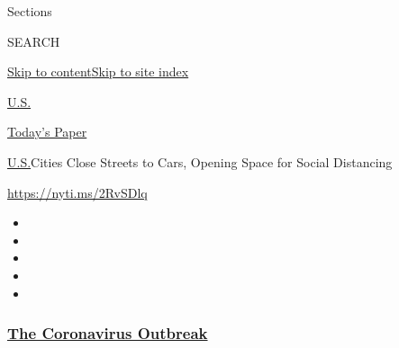Sections

SEARCH

\protect\hyperlink{site-content}{Skip to
content}\protect\hyperlink{site-index}{Skip to site index}

\href{https://www.nytimes3xbfgragh.onion/section/us}{U.S.}

\href{https://myaccount.nytimes3xbfgragh.onion/auth/login?response_type=cookie\&client_id=vi}{}

\href{https://www.nytimes3xbfgragh.onion/section/todayspaper}{Today's
Paper}

\href{/section/us}{U.S.}\textbar{}Cities Close Streets to Cars, Opening
Space for Social Distancing

\url{https://nyti.ms/2RvSDlq}

\begin{itemize}
\item
\item
\item
\item
\item
\end{itemize}

\hypertarget{the-coronavirus-outbreak}{%
\subsubsection{\texorpdfstring{\href{https://www.nytimes3xbfgragh.onion/news-event/coronavirus?name=styln-coronavirus-national\&region=TOP_BANNER\&block=storyline_menu_recirc\&action=click\&pgtype=Article\&impression_id=7f70ef90-f1d4-11ea-ad2b-99be98891f0b\&variant=undefined}{The
Coronavirus
Outbreak}}{The Coronavirus Outbreak}}\label{the-coronavirus-outbreak}}

